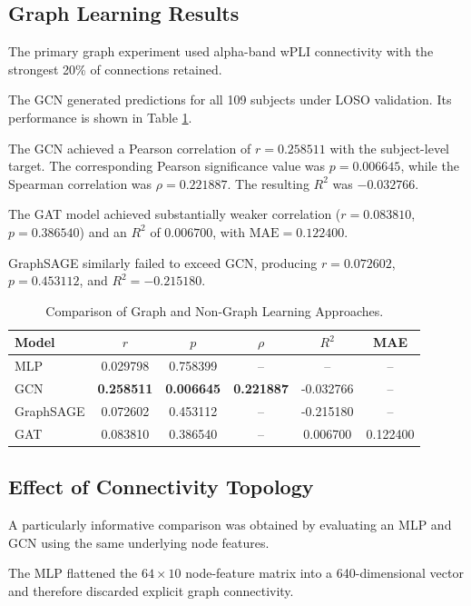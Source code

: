 \documentclass[conference]{IEEEtran}
\begin{document}
\subsection{Graph Learning Results}
The primary graph experiment used alpha-band wPLI connectivity with the strongest 20\% of connections retained.

The GCN generated predictions for all 109 subjects under LOSO validation. Its performance is shown in Table \ref{tab:graph_comparison}.

The GCN achieved a Pearson correlation of $r = 0.258511$ with the subject-level target. The corresponding Pearson significance value was $p = 0.006645$, while the Spearman correlation was $\rho = 0.221887$. The resulting $R^2$ was $-0.032766$.

The GAT model achieved substantially weaker correlation ($r = 0.083810$, $p = 0.386540$) and an $R^2$ of $0.006700$, with $\text{MAE} = 0.122400$.

GraphSAGE similarly failed to exceed GCN, producing $r = 0.072602$, $p = 0.453112$, and $R^2 = -0.215180$.

\begin{table}[b]
\caption{Comparison of Graph and Non-Graph Learning Approaches.}
\label{tab:graph_comparison}
\centering
\begin{tabular}{lccccc}
\toprule
Model & $r$ & $p$ & $\rho$ & $R^2$ & MAE \\
\midrule
MLP       & 0.029798 & 0.758399 & --       & --        & --       \\
GCN       & \textbf{0.258511} & \textbf{0.006645} & \textbf{0.221887} & -0.032766 & --       \\
GraphSAGE & 0.072602 & 0.453112 & --       & -0.215180 & --       \\
GAT       & 0.083810 & 0.386540 & --       & 0.006700  & 0.122400 \\
\bottomrule
\end{tabular}
\end{table}

\subsection{Effect of Connectivity Topology}
A particularly informative comparison was obtained by evaluating an MLP and GCN using the same underlying node features.

The MLP flattened the $64 \times 10$ node-feature matrix into a 640-dimensional vector and therefore discarded explicit graph connectivity.
\end{document}
